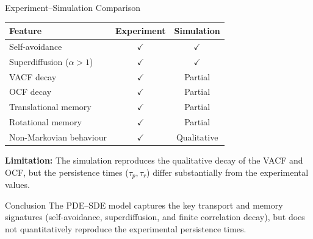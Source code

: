 \begin{frame}{Experiment--Simulation Comparison}

	\centering

	\begin{tabular}{lcc}
		\toprule
		Feature                     & Experiment   & Simulation   \\
		\midrule
		Self-avoidance              & $\checkmark$ & $\checkmark$ \\
		Superdiffusion ($\alpha>1$) & $\checkmark$ & $\checkmark$ \\
		VACF decay                  & $\checkmark$ & Partial      \\
		OCF decay                   & $\checkmark$ & Partial      \\
		Translational memory        & $\checkmark$ & Partial      \\
		Rotational memory           & $\checkmark$ & Partial      \\
		Non-Markovian behaviour     & $\checkmark$ & Qualitative  \\
		\bottomrule
	\end{tabular}

	\vspace{0.2cm}
	\begin{minipage}{0.9\linewidth}
		\footnotesize
		\textbf{Limitation:}
		The simulation reproduces the qualitative decay of the VACF and OCF,
		but the persistence times ($\tau_p,\tau_r$) differ substantially from
		the experimental values.
	\end{minipage}
	\begin{alertblock}{Conclusion}
		The PDE--SDE model captures the key transport and memory signatures
		(self-avoidance, superdiffusion, and finite correlation decay),
		but does not quantitatively reproduce the experimental persistence times.
	\end{alertblock}

\end{frame}




